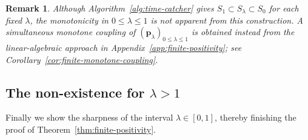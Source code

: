 \documentclass[11pt]{article}
\numberwithin{equation}{section}
\newcommand{\1}{\mathbf{1}}
\newtheorem{remark}[theorem]{Remark}
\newcommand{\bp}{\mathbf p}
\begin{document}
\begin{remark}
Although Algorithm~\ref{alg:time-catcher} gives
\(S_1\subset S_\lambda\subset S_0\) for each fixed \(\lambda\), the monotonicity
in \(0\le\lambda\le1\) is not apparent from this construction.  A
simultaneous monotone coupling of 
\((\bp_\lambda)_{0\le\lambda\le1}\) is obtained instead from the
linear-algebraic approach in Appendix~\ref{app:finite-positivity}; see
Corollary~\ref{cor:finite-monotone-coupling}.
\end{remark}


\subsection{The non-existence for \texorpdfstring{$\lambda>1$}{lambda > 1}}\label{subsec:finite-lambda-greater-one}


Finally we show the sharpness of the interval $\lambda\in[0,1]$, thereby finishing the proof of Theorem~\ref{thm:finite-positivity}.
\end{document}
